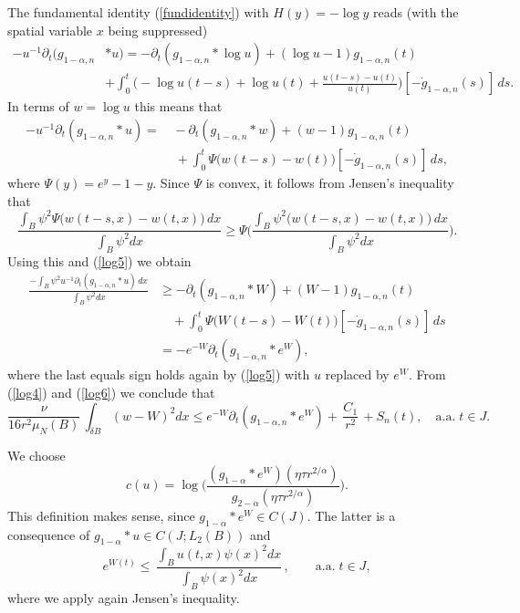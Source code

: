 \documentclass[10pt]{article}
\begin{document}
The fundamental identity (\ref{fundidentity}) with $H(y)=-\log y$
reads (with the spatial variable $x$ being suppressed)
\begin{align*}
-u^{-1}\partial_t(g_{1-\alpha,n} & \ast
u)=-\partial_t(g_{1-\alpha,n}\ast \log u)+(\log
u-1)g_{1-\alpha,n}(t)\nonumber\\
&+\int_0^t \Big(-\log u(t-s)+\log
u(t)+\frac{u(t-s)-u(t)}{u(t)}\Big)[-\dot{g}_{1-\alpha,n}(s)]\,ds.
\end{align*}
In terms of $w=\log u$ this means that
\begin{align} \label{log5}
-u^{-1}\partial_t(g_{1-\alpha,n}  \ast u)= & \,
-\partial_t(g_{1-\alpha,n}\ast
w)+(w-1)g_{1-\alpha,n}(t)\nonumber\\
& \,\,+\int_0^t
\Psi\big(w(t-s)-w(t)\big)[-\dot{g}_{1-\alpha,n}(s)]\,ds,
\end{align}
where $\Psi(y)=e^y-1-y$. Since $\Psi$ is convex, it follows from
Jensen's inequality that
\[
\frac{\int_B \psi^2 \Psi\big(w(t-s,x)-w(t,x)\big)\,dx}{\int_B
\psi^2 dx} \ge \Psi \Big( \frac{\int_B \psi^2
\big(w(t-s,x)-w(t,x)\big)\,dx}{\int_B \psi^2 dx}\Big).
\]
Using this and (\ref{log5}) we obtain
\begin{align}
\frac{-\int_B \psi^2 u^{-1}\partial_t(g_{1-\alpha,n}\ast u)
\,dx}{\int_B \psi^2 dx} & \ge -\partial_t(g_{1-\alpha,n}\ast
W)+(W-1)g_{1-\alpha,n}(t)\nonumber\\
&\quad +\int_0^t
\Psi\big(W(t-s)-W(t)\big)[-\dot{g}_{1-\alpha,n}(s)]\,ds \nonumber\\
& = -e^{-W} \partial_t(g_{1-\alpha,n}\ast e^W), \label{log6}
\end{align}
where the last equals sign holds again by (\ref{log5}) with $u$
replaced by $e^W$. From (\ref{log4}) and (\ref{log6}) we conclude
that
\begin{equation} \label{log7}
\frac{\nu}{16r^2 \mu_N(B)}\,\int_{\delta B} (w-W)^2 dx \le e^{-W}
\partial_t(g_{1-\alpha,n}\ast
e^W)+\,\frac{C_1}{r^2}\,+S_n(t),\quad \mbox{a.a.}\;t\in J.
\end{equation}

We choose
\begin{equation} \label{cwahl}
c(u)=\log \Big(\frac{(g_{1-\alpha}\ast e^W)(\eta\tau
r^{2/\alpha})}{g_{2-\alpha}(\eta\tau r^{2/\alpha})}\Big).
\end{equation}
This definition makes sense, since $g_{1-\alpha}\ast e^W\in C(J)$.
The latter is a consequence of $g_{1-\alpha}\ast u\in C(J;L_2(B))$
and
\[
e^{W(t)}\le \,\frac{\int_B u(t,x) \psi(x)^2 dx}{\int_B \psi(x)^2
dx}\,,\quad\quad \mbox{a.a.}\;t\in J,
\]
where we apply again Jensen's inequality.
\end{document}
